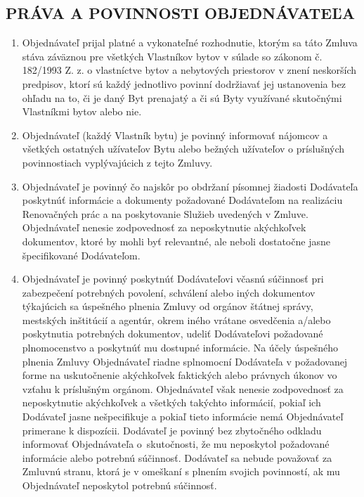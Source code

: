 \begin{multicols}{2}
\subsection{PRÁVA A POVINNOSTI OBJEDNÁVATEĽA}

\begin{enumerate}
\def\labelenumi{\arabic{enumi}.}
\item
  Objednávateľ prijal platné a vykonateľné rozhodnutie, ktorým sa táto
  Zmluva stáva záväznou pre všetkých Vlastníkov bytov v súlade so
  zákonom č. 182/1993 Z. z. o vlastníctve bytov a nebytových priestorov
  v znení neskorších predpisov, ktorí sú každý jednotlivo povinní
  dodržiavať jej ustanovenia bez ohľadu na to, či je daný Byt prenajatý
  a či sú Byty využívané skutočnými Vlastníkmi bytov alebo nie.
\item
  Objednávateľ (každý Vlastník bytu) je povinný informovať nájomcov a
  všetkých ostatných užívateľov Bytu alebo bežných užívateľov o
  príslušných povinnostiach vyplývajúcich z tejto Zmluvy.
\item
  Objednávateľ je povinný čo najskôr po obdržaní písomnej žiadosti
  Dodávateľa poskytnúť informácie a dokumenty požadované Dodávateľom na
  realizáciu Renovačných prác a na poskytovanie Služieb uvedených v
  Zmluve. Objednávateľ nenesie zodpovednosť za neposkytnutie akýchkoľvek
  dokumentov, ktoré by mohli byť relevantné, ale neboli dostatočne jasne
  špecifikované Dodávateľom.
\item
  Objednávateľ je povinný poskytnúť Dodávateľovi včasnú súčinnosť pri
  zabezpečení potrebných povolení, schválení alebo iných dokumentov
  týkajúcich sa úspešného plnenia Zmluvy od orgánov štátnej správy,
  mestských inštitúcií a agentúr, okrem iného vrátane osvedčenia a/alebo
  poskytnutia potrebných dokumentov, udeliť Dodávateľovi požadované
  plnomocenstvo a poskytnúť mu dostupné informácie. Na účely úspešného
  plnenia Zmluvy Objednávateľ riadne splnomocní Dodávateľa v požadovanej
  forme na uskutočnenie akýchkoľvek faktických alebo právnych úkonov vo
  vzťahu k príslušným orgánom. Objednávateľ však nenesie zodpovednosť za
  neposkytnutie akýchkoľvek a všetkých takýchto informácií, pokiaľ ich
  Dodávateľ jasne nešpecifikuje a pokiaľ tieto informácie nemá
  Objednávateľ primerane k dispozícii. Dodávateľ je povinný bez
  zbytočného odkladu informovať Objednávateľa o~skutočnosti, že mu
  neposkytol požadované informácie alebo potrebnú súčinnosť. Dodávateľ
  sa nebude považovať za Zmluvnú stranu, ktorá je v omeškaní s plnením
  svojich povinností, ak mu Objednávateľ neposkytol potrebnú súčinnosť.

\end{enumerate}
\end{multicols}
